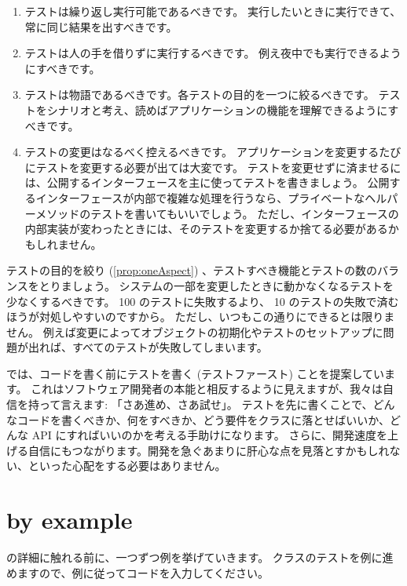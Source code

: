 \documentclass[a4paper,10pt,twoside]{book}
\begin{document}
\begin{enumerate}
\item テストは繰り返し実行可能であるべきです。
  実行したいときに実行できて、常に同じ結果を出すべきです。

\item テストは人の手を借りずに実行するべきです。
  例え夜中でも実行できるようにすべきです。

\item テストは物語であるべきです。各テストの目的を一つに絞るべきです。
  テストをシナリオと考え、読めばアプリケーションの機能を理解できるようにすべきです。 \label{prop:oneAspect}

\item テストの変更はなるべく控えるべきです。
  アプリケーションを変更するたびにテストを変更する必要が出ては大変です。
  テストを変更せずに済ませるには、公開するインターフェースを主に使ってテストを書きましょう。
  公開するインターフェースが内部で複雑な処理を行うなら、プライベートなヘルパーメソッドのテストを書いてもいいでしょう。
  ただし、インターフェースの内部実装が変わったときには、そのテストを変更するか捨てる必要があるかもしれません。

\end{enumerate}

テストの目的を絞り (\ref{prop:oneAspect}) 、テストすべき機能とテストの数のバランスをとりましょう。
システムの一部を変更したときに動かなくなるテストを少なくするべきです。
100 のテストに失敗するより、 10 のテストの失敗で済むほうが対処しやすいのですから。
ただし、いつもこの通りにできるとは限りません。
例えば変更によってオブジェクトの初期化やテストのセットアップに問題が出れば、すべてのテストが失敗してしまいます。

 では、コードを書く前にテストを書く (テストファースト) ことを提案しています。
これはソフトウェア開発者の本能と相反するように見えますが、我々は自信を持って言えます: 「さあ進め、さあ試せ」。 
テストを先に書くことで、どんなコードを書くべきか、何をすべきか、どう要件をクラスに落とせばいいか、どんな API にすればいいのかを考える手助けになります。
さらに、開発速度を上げる自信にもつながります。開発を急ぐあまりに肝心な点を見落とすかもしれない、といった心配をする必要はありません。

\section{\sunit by example}

\SUnit の詳細に触れる前に、一つずつ例を挙げていきます。  クラスのテストを例に進めますので、例に従ってコードを入力してください。
\end{document}
